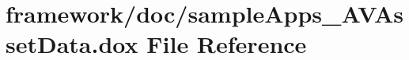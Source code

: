 \hypertarget{sample_apps___a_v_asset_data_8dox}{}\section{framework/doc/sample\+Apps\+\_\+\+A\+V\+Asset\+Data.dox File Reference}
\label{sample_apps___a_v_asset_data_8dox}
